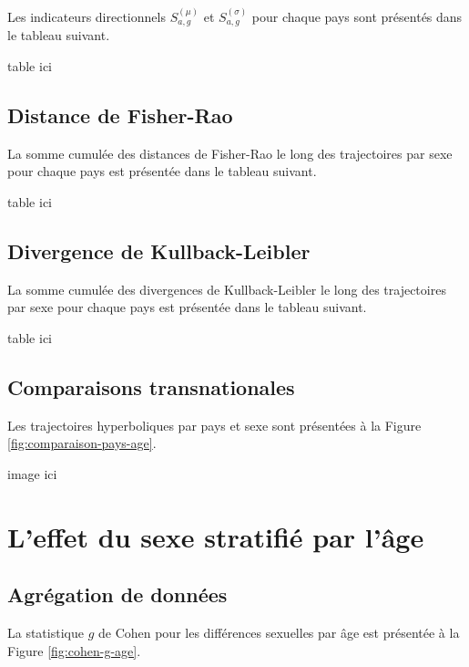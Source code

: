 Les indicateurs directionnels $S_{a,g}^{(\mu)}$ et $S_{a,g}^{(\sigma)}$ pour chaque pays sont présentés dans le tableau suivant.

%
table ici

\subsection{Distance de Fisher-Rao}

La somme cumulée des distances de Fisher-Rao le long des trajectoires par sexe pour chaque pays est présentée dans le tableau suivant.

%
table ici

\subsection{Divergence de Kullback-Leibler}

La somme cumulée des divergences de Kullback-Leibler le long des trajectoires par sexe pour chaque pays est présentée dans le tableau suivant.

%
table ici

\subsection{Comparaisons transnationales}

Les trajectoires hyperboliques par pays et sexe sont présentées à la Figure \ref{fig:comparaison-pays-age}.

image ici

\section{L'effet du sexe stratifié par l'âge}

\subsection{Agrégation de données}

La statistique $g$ de Cohen pour les différences sexuelles par âge est présentée à la Figure \ref{fig:cohen-g-age}.

